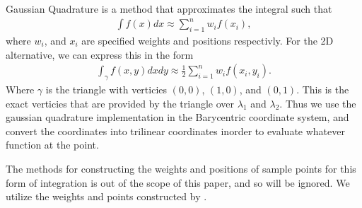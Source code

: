 \documentclass[../fem.tex]{subfiles}
\begin{document}
Gaussian Quadrature is a method that approximates the integral such that
\begin{align*}
  \int f(x)dx\approx \sum_{i=1}^nw_if(x_i),
\end{align*}
where $w_i$, and $x_i$ are specified weights and positions respectivly. For the
2D alternative, we can express this in the form
\begin{align*}
  \int_\gamma f(x,y) dxdy\approx \frac{1}{2}\sum_{i=1}^nw_if(x_i,y_i).
\end{align*}
Where $\gamma$ is the triangle with verticies $(0,0)$, $(1,0)$, and $(0,1)$.
This is the exact verticies that are provided by the triangle over $\lambda_1$
and $\lambda_2$. Thus we use the gaussian quadrature implementation in the
Barycentric coordinate system, and convert the coordinates into trilinear
coordinates inorder to evaluate whatever function at the point.

The methods for constructing the weights and positions of sample points for
this form of integration is out of the scope of this paper, and so will be
ignored. We utilize the weights and points constructed by \cite{GQ}.
\end{document}

